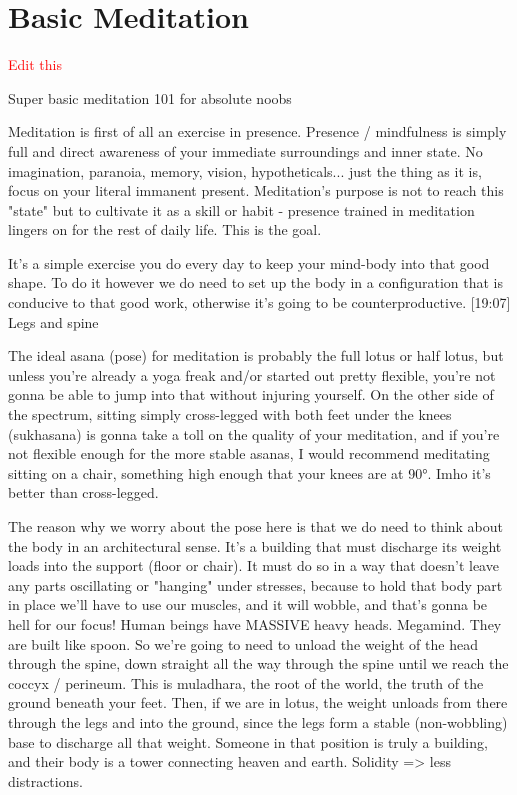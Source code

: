 \documentclass[a4paper,14pt]{memoir}
\newcommand{\cmmnt}[1]{\textcolor{red}{#1}}
\begin{document}
\section{Basic Meditation}

\cmmnt{Edit this}

Super basic meditation 101 for absolute noobs

Meditation is first of all an exercise in presence. Presence / mindfulness is simply full and direct awareness of your immediate surroundings and inner state. No imagination, paranoia, memory, vision, hypotheticals... just the thing as it is, focus on your literal immanent present. Meditation's purpose is not to reach this "state" but to cultivate it as a skill or habit - presence trained in meditation lingers on for the rest of daily life. This is the goal.

It's a simple exercise you do every day to keep your mind-body into that good shape. To do it however we do need to set up the body in a configuration that is conducive to that good work, otherwise it's going to be counterproductive.
[19:07]
Legs and spine

The ideal asana (pose) for meditation is probably the full lotus or half lotus, but unless you're already a yoga freak and/or started out pretty flexible, you're not gonna be able to jump into that without injuring yourself. On the other side of the spectrum, sitting simply cross-legged with both feet under the knees (sukhasana) is gonna take a toll on the quality of your meditation, and if you're not flexible enough for the more stable asanas, I would recommend meditating sitting on a chair, something high enough that your knees are at 90°. Imho it's better than cross-legged.

The reason why we worry about the pose here is that we do need to think about the body in an architectural sense. It's a building that must discharge its weight loads into the support (floor or chair). It must do so in a way that doesn't leave any parts oscillating or "hanging" under stresses, because to hold that body part in place we'll have to use our muscles, and it will wobble, and that's gonna be hell for our focus! Human beings have MASSIVE heavy heads. Megamind. They are built like spoon. So we're going to need to unload the weight of the head through the spine, down straight all the way through the spine until we reach the coccyx / perineum. This is muladhara, the root of the world, the truth of the ground beneath your feet. Then, if we are in lotus, the weight unloads from there through the legs and into the ground, since the legs form a stable (non-wobbling) base to discharge all that weight. Someone in that position is truly a building, and their body is a tower connecting heaven and earth. Solidity => less distractions.
\end{document}
